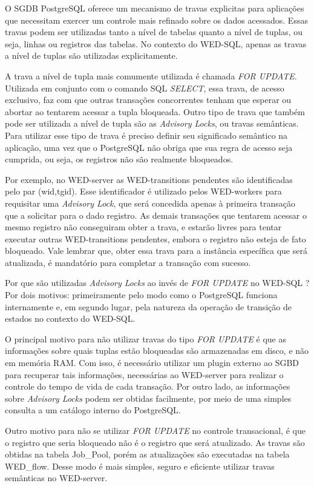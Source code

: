 \documentclass[conference]{IEEEtran}
\begin{document}
\par O SGDB PostgreSQL oferece um mecanismo de travas explicitas para aplicações que necessitam exercer um controle mais
refinado sobre os dados acessados. Essas travas podem ser utilizadas tanto a nível de tabelas quanto a nível de tuplas, ou seja,
linhas ou registros das tabelas. No contexto do WED-SQL, apenas as travas a nível de tuplas são utilizadas explicitamente.
\par A trava a nível de tupla mais comumente utilizada é chamada \emph{FOR UPDATE}. Utilizada em conjunto com o comando SQL
\emph{SELECT}, essa trava, de acesso exclusivo, faz com que outras transações concorrentes tenham que esperar ou abortar
ao tentarem acessar a tupla bloqueada. Outro tipo de trava que também pode ser utilizada a nível de tupla são as 
\emph{Advisory Locks}, ou travas semânticas. Para utilizar esse tipo de trava é preciso definir seu significado semântico na aplicação, uma vez que
o PostgreSQL não obriga que sua regra de acesso seja cumprida, ou seja, os registros não são realmente bloqueados. 
\par Por exemplo, no WED-server as WED-transitions pendentes são identificadas pelo par (wid,tgid). Esse identificador é
utilizado pelos WED-workers para requisitar uma \emph{Advisory Lock}, que será concedida apenas à primeira transação que
a solicitar para o dado registro. As demais transações que tentarem acessar o mesmo registro não conseguiram obter a trava,
e estarão livres para tentar executar outras WED-transitions pendentes, embora o registro não esteja de fato bloqueado. Vale
lembrar que, obter essa trava para a instância específica que será atualizada, é mandatório para completar a transação com sucesso.
\par Por que são utilizadas \emph{Advisory Locks} ao invés de \emph{FOR UPDATE} no WED-SQL ? Por dois motivos: primeiramente
pelo modo como o PostgreSQL funciona internamente e, em segundo lugar, pela natureza da operação de  transição de estados
no contexto do WED-SQL. 
\par O principal motivo para não utilizar travas do tipo \emph{FOR UPDATE} é que as informações sobre
quais tuplas estão bloqueadas são armazenadas em disco, e não em memória RAM. Com isso, é necessário utilizar um plugin
externo ao SGBD para recuperar tais informações, necessárias ao WED-server para realizar o controle do tempo de vida
de cada transação. Por outro lado, as informações sobre \emph{Advisory Locks} podem ser obtidas facilmente, por meio de
uma simples consulta a um catálogo interno do PostgreSQL. 
\par Outro motivo para não se utilizar \emph{FOR UPDATE} no controle transacional, é que o registro que seria bloqueado
não é o registro que será atualizado. As travas são obtidas na tabela Job\_Pool, porém as atualizações são executadas na
tabela WED\_flow. Desse modo é mais simples, seguro e eficiente utilizar travas semânticas no WED-server.
\end{document}
